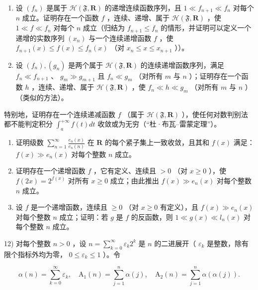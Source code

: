 \begin{enumerate}
\def\labelenumi{\alph{enumi})}
\setcounter{enumi}{1}
\item
  设 \((f_n)\) 是属于 \(\mathcal{H}(\mathfrak{F},\mathbf{R})\) 的递增连续函数序列，且 \(1\ll f_{n + 1}\ll f_n\) 对每个 \(n\) 成立。证明存在一个函数 \(f\) ，连续、递增、属于 \(\mathcal{H}(\mathfrak{F},\mathbf{R})\) ，使 \(1\ll f\ll f_n\) 对每个 \(n\) 成立（归结为 \(f_{n + 1}\leqslant f_n\) 的情形，并证明可以定义一个递增的实数序列 \((x_{n})\) 与一个连续递增函数 \(f\) ，使 \(f_{n + 1}(x)\leqslant f(x)\leqslant f_n(x)\) （对 \(x_{n}\leqslant x\leqslant x_{n + 1}\) ））。
\item
  设 \((f_n), (g_n)\) 是两个属于 \(\mathcal{H}(\mathfrak{F}, \mathbf{R})\) 的连续递增函数序列，满足 \(f_n \ll f_{n+1}\) 、 \(g_m \gg g_{m+1}\) 且 \(f_n \ll g_m\) （对所有 \(m\) 与 \(n\) ）；证明存在一个函数 \(h\) ，连续、递增、属于 \(\mathcal{H}(\mathfrak{F}, \mathbf{R})\) ，使 \(f_n \ll h \ll g_m\) （对所有 \(m\) 与 \(n\) ）（类似的方法）。
\end{enumerate}

特别地，证明存在一个连续递减函数 \(f\) （属于 \(\mathcal{H}(\mathfrak{F},\mathbf{R})\) ），使任何对数判别法都不能判定积分 \(\int_{a}^{+\infty}f(t)dt\) 收敛或为无穷（“杜·布瓦–雷蒙定理”）。

\begin{enumerate}
\def\labelenumi{\arabic{enumi})}
\setcounter{enumi}{8}
\item
  证明级数 \(\sum_{n=1}^{\infty} \frac{e_n(x)}{e_n(n)}\) 在 \(\mathbf{R}\) 的每个紧子集上一致收敛，且其和 \(f(x)\) 满足： \(f(x) \gg e_n(x)\) 对每个整数 \(n\) 成立。
\item
  证明存在一个递增函数 \(f\) ，它有定义、连续且 \(> 0\) （对 \(x \geqslant 0\) ），使 \(f(2x) = 2^{f(x)}\) 对所有 \(x \geqslant 0\) 成立；由此推出 \(f(x) \gg e_n(x)\) 对每个整数 \(n\) 成立。
\item
  设 \(f\) 是一个递增函数，连续且 \(\geqslant 0\) （对 \(x \geqslant 0\) 有定义），且 \(f(x) \gg e_n(x)\) 对每个整数 \(n\) 成立；证明：若 \(g\) 是 \(f\) 的反函数，则 \(1 \ll g(x) \ll l_n(x)\) 对每个整数 \(n\) 成立。
\end{enumerate}

12) 对每个整数 \(n > 0\) ，设 \(n = \sum_{k=0}^{\infty} \varepsilon_k 2^k\) 是 \(n\) 的二进展开（ \(\varepsilon_k\) 是整数，除有限个指标外均为零， \(0 \leqslant \varepsilon_k \leqslant 1\) ）。令

\[
\alpha (n) = \sum_ {k = 0} ^ {\infty} \varepsilon_ {k}, \quad \mathrm{A} _ {1} (n) = \sum_ {j = 1} ^ {n} \alpha (j), \quad \mathrm{A} _ {2} (n) = \sum_ {j = 1} ^ {n} \alpha (\alpha (j)).
\]

